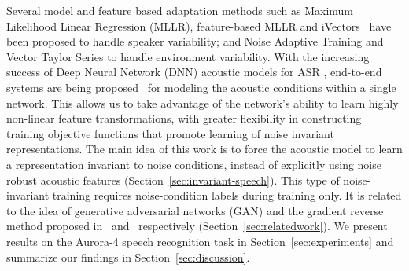 \documentclass{article}
\begin{document}
    Several model and feature based adaptation methods such as Maximum Likelihood Linear Regression (MLLR),  feature-based MLLR 
    and iVectors~\citep{saon2013speaker} have been proposed to handle speaker variability; and Noise Adaptive Training \citep[NAT;][]{kalinli2010noise}
    and Vector Taylor Series \citep[VTS;][]{un1998speech} to handle environment variability. With the increasing success of Deep Neural Network (DNN) 
    acoustic models for ASR \citep{hinton2012deep,seide2011conversational,sainath2011making}, end-to-end systems are being proposed~\citep{miao2015eesen,sainath2015learning} 
    for modeling the acoustic conditions within a single network. This allows us to take advantage of the network's ability to learn 
    highly non-linear feature transformations, with greater flexibility in constructing training objective functions that promote learning 
    of noise invariant representations. The main idea of this work is to force the acoustic model to learn a representation invariant to 
    noise conditions, instead of explicitly using noise robust acoustic features (Section~\ref{sec:invariant-speech}). This type of 
    noise-invariant training requires noise-condition labels during training only. It is related to the idea of generative adversarial 
    networks (GAN) and the gradient reverse method proposed in~\cite{goodfellow2014generative} and~\cite{ganin2014unsupervised} respectively 
    (Section~\ref{sec:relatedwork}). We present results on the Aurora-4 speech recognition task in Section~\ref{sec:experiments} and summarize 
    our findings in Section~\ref{sec:discussion}.
    
\end{document}

